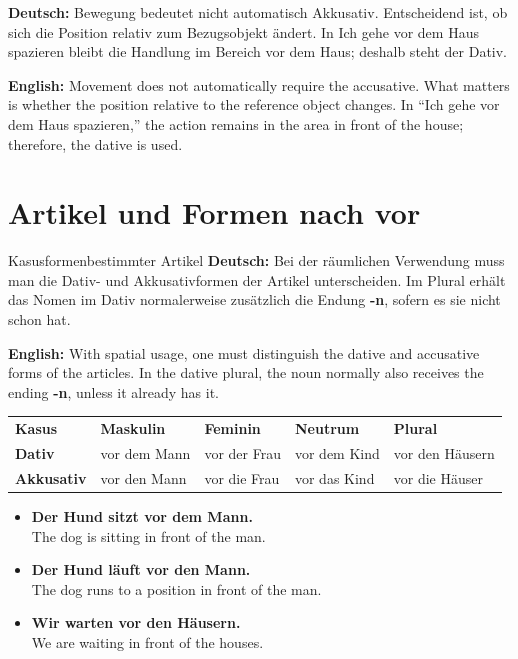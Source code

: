 \documentclass[a4paper,11pt]{article}
\newcommand{\GermanText}[1]{\textbf{Deutsch: }#1\par}
\newcommand{\EnglishText}[1]{{\small\color{SoftGray}\textbf{English: }#1\par}}
\newcommand{\ExampleItem}[2]{\item \textbf{#1}\\{\small\color{SoftGray}#2}}
\begin{document}
        \begin{warningbox}
            \GermanText{Bewegung bedeutet nicht automatisch Akkusativ. Entscheidend ist, ob sich die Position relativ zum Bezugsobjekt ändert. In \glqq Ich gehe vor dem Haus spazieren\grqq{} bleibt die Handlung im Bereich vor dem Haus; deshalb steht der Dativ.}
            \EnglishText{Movement does not automatically require the accusative. What matters is whether the position relative to the reference object changes. In ``Ich gehe vor dem Haus spazieren,'' the action remains in the area in front of the house; therefore, the dative is used.}
        \end{warningbox}


    \section{Artikel und Formen nach \glqq vor\grqq}

        \begin{grammarentry}{Kasusformen}{bestimmter Artikel}
            \GermanText{Bei der räumlichen Verwendung muss man die Dativ- und Akkusativformen der Artikel unterscheiden. Im Plural erhält das Nomen im Dativ normalerweise zusätzlich die Endung \textbf{-n}, sofern es sie nicht schon hat.}
            \EnglishText{With spatial usage, one must distinguish the dative and accusative forms of the articles. In the dative plural, the noun normally also receives the ending \textbf{-n}, unless it already has it.}
        \end{grammarentry}

        \begin{longtable}{>{\bfseries}p{2.6cm}p{2.8cm}p{2.8cm}p{2.8cm}p{3.2cm}}
            \rowcolor{HeaderBlueDark}
            \color{white}\textbf{Kasus} &
            \color{white}\textbf{Maskulin} &
            \color{white}\textbf{Feminin} &
            \color{white}\textbf{Neutrum} &
            \color{white}\textbf{Plural} \\
            Dativ & vor dem Mann & vor der Frau & vor dem Kind & vor den Häusern \\
            Akkusativ & vor den Mann & vor die Frau & vor das Kind & vor die Häuser \\
        \end{longtable}

        \begin{exbox}
            \begin{itemize}
                \ExampleItem{Der Hund sitzt vor dem Mann.}{The dog is sitting in front of the man.}
                \ExampleItem{Der Hund läuft vor den Mann.}{The dog runs to a position in front of the man.}
                \ExampleItem{Wir warten vor den Häusern.}{We are waiting in front of the houses.}
            \end{itemize}
        \end{exbox}
\end{document}
